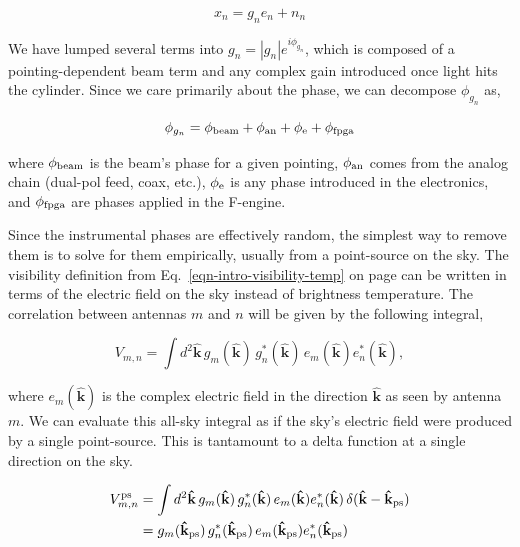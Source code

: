 \begin{equation}
     x_n = g_n e_n + n_n
\end{equation}

\noindent We have lumped several terms into $g_n = |g_n| e^{i \phi_{g_n}}$, 
which is composed of a pointing-dependent beam term
and any complex gain introduced once light hits the cylinder. 
Since we care primarily about the phase, we can decompose $\phi_{g_n}$
as,

\begin{equation}
\phi_{g_n} = \phi_{\rm beam} + \phi_{\rm an} + \phi_{\rm e} + \phi_{\rm fpga} 
\end{equation}

\noindent where $\phi_{\rm beam}$ is the beam's phase for a given pointing, 
$\phi_{\rm an}$ comes from the analog chain (dual-pol feed, coax, etc.),  
$\phi_{\rm e}$ is any phase introduced in the electronics, 
and $\phi_{\rm fpga}$ are phases applied in the F-engine. 

Since the instrumental phases are effectively random, the simplest 
way to remove them is to solve for them empirically, usually from 
a point-source on the sky. The visibility definition from 
Eq.~\ref{eqn-intro-visibility-temp} on page \pageref{eqn-intro-visibility-temp}
can be written in terms 
of the electric field on the sky 
instead of brightness temperature.
The correlation between antennas $m$ and $n$ will be given 
by the following integral,

\begin{equation}
\label{eqn-visibility}
     V_{m,n} = \int d^2\mathbf{\hat{k}} \,
     g_m(\mathbf{\hat{k}}) \, g^*_n(\mathbf{\hat{k}})\, e_m(\mathbf{\hat{k}}) e_n^*(\mathbf{\hat{k}}),
\end{equation}

\noindent where $e_m(\mathbf{\hat{k}})$ is the complex electric 
field in the direction $\mathbf{\hat{k}}$ as seen by 
antenna $m$. We can evaluate this all-sky integral 
as if the sky's electric field were produced by a single point-source. 
This is tantamount to a delta function at a single direction on the sky.

\begin{align}
\label{eqn-vis_delta}
V^{\rm ps}_{m,n} &= \int d^2\mathbf{\hat{k}} \, g_m(\mathbf{\hat{k}}) \, g^*_n(\mathbf{\hat{k}})\, e_m(\mathbf{\hat{k}}) e_n^*(\mathbf{\hat{k}})\, \delta(\mathbf{\hat{k}} - \mathbf{\hat{k}}_{\rm ps})\\
 &= {g}_m(\mathbf{\hat{k}}_{\rm ps}) \, g^*_n(\mathbf{\hat{k}}_{\rm ps})\,e_m(\mathbf{\hat{k}}_{\rm ps}) e_n^*(\mathbf{\hat{k}}_{\rm ps})
\end{align}

